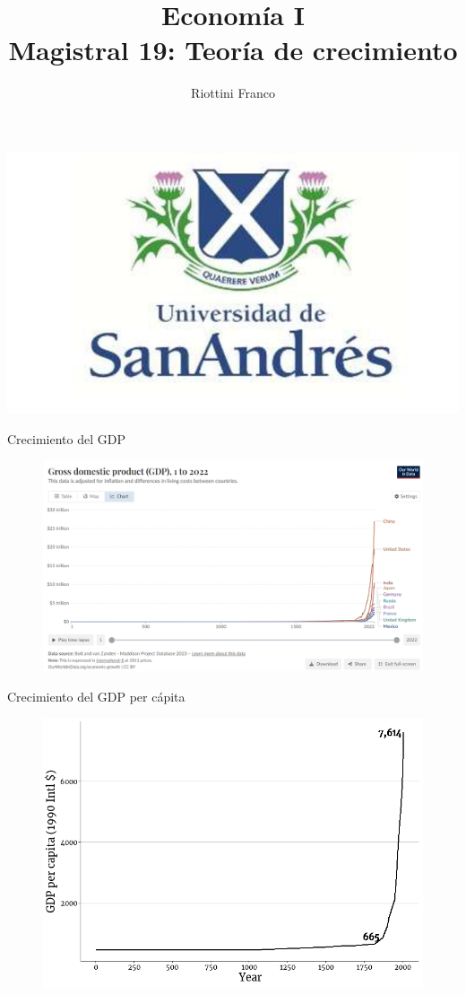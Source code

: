 \documentclass{beamer}
\title[Economía I]{Economía I \vspace{4mm}
\\ Magistral 19: Teoría de crecimiento}
\date{}
\author[Franco Riottini]{Riottini Franco}
\institute[]{Universidad de San Andrés}
\begin{document}
\begin{frame}
\titlepage
\centering

\includegraphics[scale=0.2]{../Figures/logoUDESA.jpg} 
\end{frame}

\begin{frame}{Crecimiento del GDP}
    \begin{figure} [H]   
        \includegraphics[scale=0.4]{../Figures/gdp_growth_ourworldindata.png}
    \end{figure}
\end{frame}

\begin{frame}{Crecimiento del GDP per cápita}
    \begin{figure} [H]   
        \includegraphics[scale=0.5]{../Figures/C17.1.png}
    \end{figure}
\end{frame}
\end{document}
